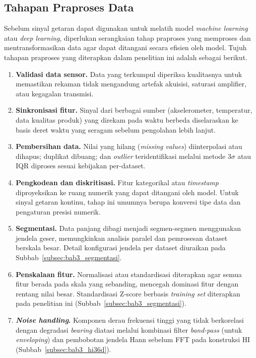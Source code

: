 {\color{blue}
\subsection{Tahapan Praproses Data}
\label{subsec:bab3_tahapan_praproses}

Sebelum sinyal getaran dapat digunakan untuk melatih model \emph{machine
learning} atau \emph{deep learning}, diperlukan serangkaian tahap praproses
yang memproses dan mentransformasikan data agar dapat ditangani secara
efisien oleh model. Tujuh tahapan praproses yang diterapkan dalam penelitian
ini adalah sebagai berikut.
}

{\color{blue}
\begin{enumerate}
  \item \textbf{Validasi data sensor.} Data yang terkumpul diperiksa
        kualitasnya untuk memastikan rekaman tidak mengandung artefak akuisisi,
        saturasi amplifier, atau kegagalan transmisi.
  \item \textbf{Sinkronisasi fitur.} Sinyal dari berbagai sumber (akselerometer,
        temperatur, data kualitas produk) yang direkam pada waktu berbeda
        diselaraskan ke basis deret waktu yang seragam sebelum pengolahan lebih
        lanjut.
  \item \textbf{Pembersihan data.} Nilai yang hilang (\emph{missing values})
        diinterpolasi atau dihapus; duplikat dibuang; dan \emph{outlier}
        teridentifikasi melalui metode $3\sigma$ atau IQR diproses sesuai
        kebijakan per-dataset.
  \item \textbf{Pengkodean dan diskritisasi.} Fitur kategorikal atau
        \emph{timestamp} diproyeksikan ke ruang numerik yang dapat ditangani
        oleh model. Untuk sinyal getaran kontinu, tahap ini umumnya berupa
        konversi tipe data dan pengaturan presisi numerik.
  \item \textbf{Segmentasi.} Data panjang dibagi menjadi segmen-segmen
        menggunakan jendela geser, memungkinkan analisis paralel dan pemrosesan
        dataset berskala besar. Detail konfigurasi jendela per dataset
        diuraikan pada Subbab~\ref{subsec:bab3_segmentasi}.
  \item \textbf{Penskalaan fitur.} Normalisasi atau standardisasi diterapkan
        agar semua fitur berada pada skala yang sebanding, mencegah dominasi
        fitur dengan rentang nilai besar. Standardisasi Z-score berbasis
        \emph{training set} diterapkan pada penelitian ini
        (Subbab~\ref{subsec:bab3_segmentasi}).
  \item \textbf{\emph{Noise handling}.} Komponen derau frekuensi tinggi yang
        tidak berkorelasi dengan degradasi \emph{bearing} diatasi melalui
        kombinasi filter \emph{band-pass} (untuk \emph{enveloping}) dan
        pembobotan jendela Hann sebelum FFT pada konstruksi HI
        (Subbab~\ref{subsec:bab3_hi36d}).
\end{enumerate}
}

